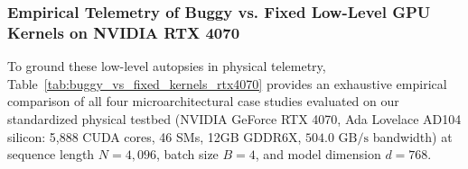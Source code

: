 \subsubsection{Empirical Telemetry of Buggy vs. Fixed Low-Level GPU Kernels on NVIDIA RTX 4070}
\label{sec:ablations_buggy_fixed_table}

To ground these low-level autopsies in physical telemetry, Table~\ref{tab:buggy_vs_fixed_kernels_rtx4070} provides an exhaustive empirical comparison of all four microarchitectural case studies evaluated on our standardized physical testbed (NVIDIA GeForce RTX 4070, Ada Lovelace AD104 silicon: 5,888 CUDA cores, 46 SMs, 12GB GDDR6X, $504.0\text{ GB/s}$ bandwidth) at sequence length $N = 4{,}096$, batch size $B=4$, and model dimension $d=768$.

